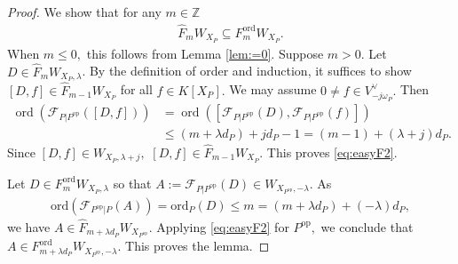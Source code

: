 \documentclass[11pt,a4paper,usenames,dvipsnames,reqno]{amsart}
\numberwithin{equation}{section}
\newcommand{\zz}{\mathbb Z}
\theoremstyle{definition}
\theoremstyle{remark}
\begin{document}
\begin{proof}
We show that for any $m\in \zz$
\begin{align}\label{eq:easyF2}
    \widehat{F}_mW_{X_P}\subseteq F_m^{\mathrm{ord}}W_{X_P}.
\end{align}
When $m\le 0,$ this follows from Lemma \ref{lem:=0}. Suppose $m>0.$ Let $D\in \widehat{F}_mW_{X_P,\lambda}$. By the definition of order and induction, it suffices to show $[D,f]\in \widehat{F}_{m-1}W_{X_P}$ for all $f\in K[X_P].$ We may assume $0\neq f\in V^{\lor}_{-j\omega_P}.$ Then
\begin{align*}
    \operatorname{ord}(\mathcal{F}_{P|P^{\mathrm{op}}}([D,f]))&=\operatorname{ord} ([\mathcal{F}_{P|P^{\mathrm{op}}}(D),\mathcal{F}_{P|P^{\mathrm{op}}}(f)])\\
    &\le (m+\lambda d_P)+jd_P-1 =(m-1)+(\lambda+j)d_P.
\end{align*}
Since $[D,f]\in W_{X_P,\lambda+j},$ $[D,f]\in \widehat F_{m-1}W_{X_P}$. This proves \eqref{eq:easyF2}.

Let $D\in F_m^{\mathrm{ord}}W_{X_P,\lambda}$ so that $ A:=\mathcal{F}_{P|P^{\mathrm{op}}}(D)\in W_{X_{P^{\mathrm{op}}},-\lambda}$. As
\begin{align*}
\mathrm{ord}(\mathcal{F}_{P^{\mathrm{op}}|P}(A))=\mathrm{ord}_P(D)\le m=
(m+\lambda d_P)+(-\lambda)d_P,
\end{align*}
we have $A\in \widehat{F}_{m+\lambda d_P}W_{X_{P^{\mathrm{op}}}}.$ Applying \eqref{eq:easyF2} for $P^{\mathrm{op}},$ we conclude that $A\in F_{m+\lambda d_P}^{\mathrm{ord}}W_{X_{P^{\mathrm{op}}},-\lambda}.$ This proves the lemma.
\end{proof}

\end{document}
